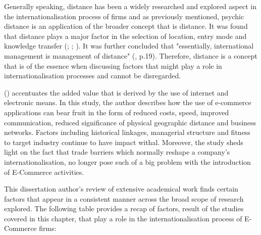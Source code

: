 \documentclass[11pt,a4paper]{article}
\begin{document}
Generally speaking, distance has been a widely researched and explored aspect in the internationalisation process of firms and as previously mentioned, psychic distance is an application of the broader concept that is distance. It was found that distance plays a major factor in the selection of location, entry mode and knowledge transfer (\cite{xuInstitutionalDistanceMultinational2002}; \cite{kostovaTransnationalTransferStrategic1999}; \cite{tihanyiEffectCulturalDistance2005}). It was further concluded that "essentially, international management is management of distance" (\cite{zaheerDistanceDirectionRestoring2012}, p.19). Therefore, distance is a concept that is of the essence when discussing factors that might play a role in internationalisation processes and cannot be disregarded. \par
\citeauthor{terziImpactEcommerceInternational2011} (\citeyear{terziImpactEcommerceInternational2011}) accentuates the added value that is derived by the use of internet and electronic means. In this study, the author describes how the use of e-commerce applications can bear fruit in the form of reduced costs, speed, improved communication, reduced significance of physical geographic distance and business networks. Factors including historical linkages, managerial structure and fitness to target industry continue to have impact withal. Moreover, the study sheds light on the fact that trade barriers which normally reshape a company's internationalisation, no longer pose such of a big problem with the introduction of E-Commerce activities. \par

This dissertation author's review of extensive academical work finds certain factors that appear in a consistent manner across the broad scope of research explored. The following table provides a recap of factors, result of the studies covered in this chapter, that play a role in the internationalisation process of E-Commerce firms:
\end{document}
